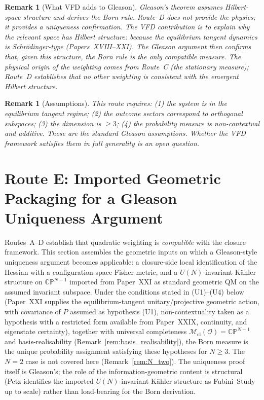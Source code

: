 \documentclass[12pt]{article}
\newtheorem{remark}[theorem]{Remark}
\newcommand{\Ocal}{\mathcal{O}}
\newcommand{\Mcl}{\mathcal{M}_{\mathrm{cl}}}
\begin{document}
\begin{remark}[What VFD adds to Gleason]
Gleason's theorem assumes Hilbert-space structure and derives the Born rule. Route~D does not provide the physics; it provides a \textit{uniqueness confirmation}. The VFD contribution is to explain \textit{why} the relevant space has Hilbert structure: because the equilibrium tangent dynamics is Schr\"odinger-type (Papers~XVIII--XXI). The Gleason argument then confirms that, given this structure, the Born rule is the only compatible measure. The physical origin of the weighting comes from Route~C (the stationary measure); Route~D establishes that no other weighting is consistent with the emergent Hilbert structure.
\end{remark}

\begin{remark}[Assumptions]
This route requires: (1) the system is in the equilibrium tangent regime; (2) the outcome sectors correspond to orthogonal subspaces; (3) the dimension is $\geq 3$; (4) the probability measure is non-contextual and additive. These are the standard Gleason assumptions. Whether the VFD framework satisfies them in full generality is an open question.
\end{remark}

\section{Route E: Imported Geometric Packaging for a Gleason Uniqueness Argument}\label{sec:chentsov}

Routes~A--D establish that quadratic weighting is \emph{compatible} with the closure framework. This section assembles the geometric inputs on which a Gleason-style uniqueness argument becomes applicable: a closure-side local identification of the Hessian with a configuration-space Fisher metric, and a $U(N)$-invariant K\"ahler structure on $\mathbb{CP}^{N-1}$ imported from Paper~XXI as standard geometric QM on the assumed invariant subspace. Under the conditions stated in (U1)--(U4) below (Paper~XXI supplies the equilibrium-tangent unitary/projective geometric action, with covariance of $P$ assumed as hypothesis (U1), non-contextuality taken as a hypothesis with a restricted form available from Paper~XXIX, continuity, and eigenstate certainty), together with universal completeness $\Mcl(\Ocal) = \mathbb{CP}^{N-1}$ and basis-realisability (Remark~\ref{rem:basis_realisability}), the Born measure is the unique probability assignment satisfying these hypotheses for $N \geq 3$. The $N = 2$ case is not covered here (Remark~\ref{rem:N_two}). The uniqueness proof itself is Gleason's; the role of the information-geometric content is structural (Petz identifies the imported $U(N)$-invariant K\"ahler structure as Fubini--Study up to scale) rather than load-bearing for the Born derivation.
\end{document}
